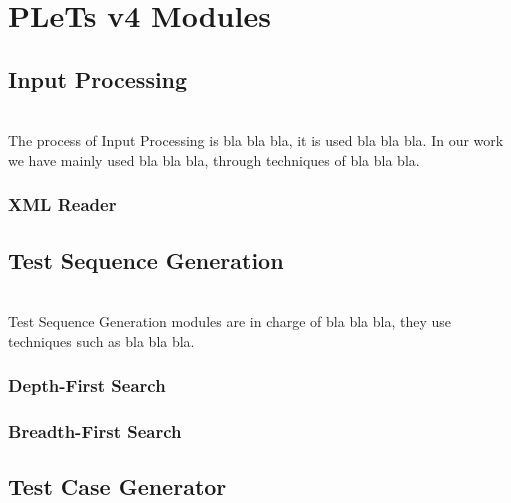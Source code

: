 \chapter{PLeTs v4 Modules}
\label{ch:modules}


\section{Input Processing}

\\The process of Input Processing is bla bla bla, it is used bla bla bla. In our work we have mainly used bla bla bla, through techniques of bla bla bla.


\subsection{XML Reader}


\section{Test Sequence Generation}

\\Test Sequence Generation modules are in charge of bla bla bla, they use techniques such as bla bla bla.


\subsection{Depth-First Search}


\subsection{Breadth-First Search}


\section{Test Case Generator}

